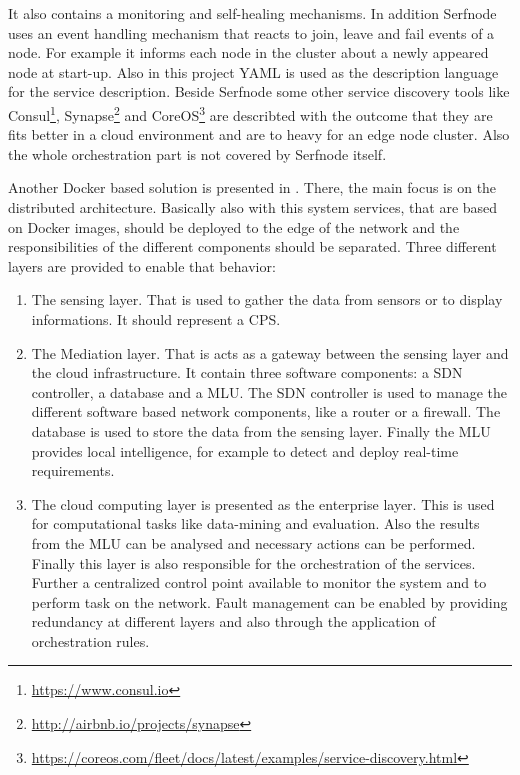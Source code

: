 It also contains a monitoring and self-healing mechanisms.\autocite[cf.][p. 34]{Stubbs:2015}
In addition Serfnode uses an event handling mechanism that reacts to join, leave and fail events of a node.\autocite[cf.][p. 38]{Stubbs:2015}
For example it informs each node in the cluster about a newly appeared node at start-up.\autocite[cf.][p. 37]{Stubbs:2015}
Also in this project \ac{YAML} is used as the description language for the service description.
Beside Serfnode some other service discovery tools like Consul\footnote{\url{https://www.consul.io}}, Synapse\footnote{\url{http://airbnb.io/projects/synapse}} and CoreOS\footnote{\url{https://coreos.com/fleet/docs/latest/examples/service-discovery.html}} are describted with the outcome that they are fits better in a cloud environment and are to heavy for an edge node cluster.\autocite[cf.][p. 36]{Stubbs:2015}
Also the whole orchestration part is not covered by Serfnode itself.

Another Docker based solution is presented in \autocite{Rufino:2017}.
There, the main focus is on the distributed architecture.
Basically also with this system services, that are based on Docker images, should be deployed to the edge of the network and the responsibilities of the different components should be separated.
Three different layers are provided to enable that behavior:

\begin{enumerate}
  \item The sensing layer.
  That is used to gather the data from sensors or to display informations.
  It should represent a \ac{CPS}.
  \item The Mediation layer.
  That is acts as a gateway between the sensing layer and the cloud infrastructure.
  It contain three software components: a \ac{SDN} controller, a database and a \ac{MLU}.\autocite[cf.][p. 1534]{Rufino:2017}
  The \ac{SDN} controller is used to manage the different software based network components, like a router or a firewall.
  The database is used to store the data from the sensing layer.
  Finally the \ac{MLU} provides local intelligence, for example to detect and deploy real-time requirements.\autocite[cf.][p. 1534]{Rufino:2017}
  \item The cloud computing layer is presented as the enterprise layer.
  This is used for computational tasks like data-mining and evaluation.\autocite[cf.][p. 1534]{Rufino:2017}
  Also the results from the \ac{MLU} can be analysed and necessary actions can be performed.\autocite[cf.][p. 1534]{Rufino:2017}
  Finally this layer is also responsible for the orchestration of the services.
  Further a centralized control point available to monitor the system and to perform task on the network.
  Fault management can be enabled by providing redundancy at different layers and also through the application of orchestration rules.\autocite[cf.][p. 1535]{Rufino:2017}
\end{enumerate}

